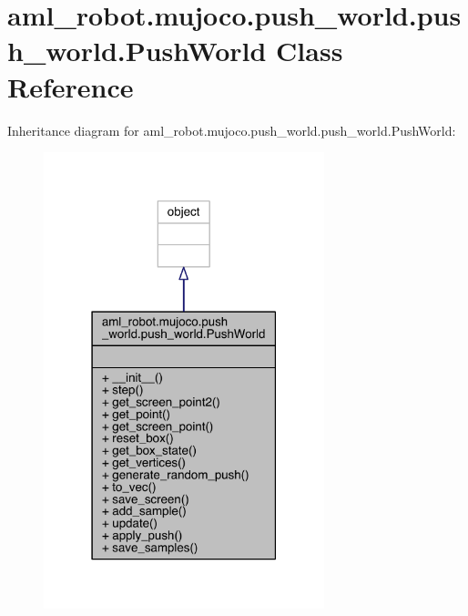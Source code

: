 \hypertarget{classaml__robot_1_1mujoco_1_1push__world_1_1push__world_1_1_push_world}{}\section{aml\+\_\+robot.\+mujoco.\+push\+\_\+world.\+push\+\_\+world.\+Push\+World Class Reference}
\label{classaml__robot_1_1mujoco_1_1push__world_1_1push__world_1_1_push_world}


Inheritance diagram for aml\+\_\+robot.\+mujoco.\+push\+\_\+world.\+push\+\_\+world.\+Push\+World\+:
\nopagebreak
\begin{figure}[H]
\begin{center}
\leavevmode
\includegraphics[width=231pt]{classaml__robot_1_1mujoco_1_1push__world_1_1push__world_1_1_push_world__inherit__graph}
\end{center}
\end{figure}


